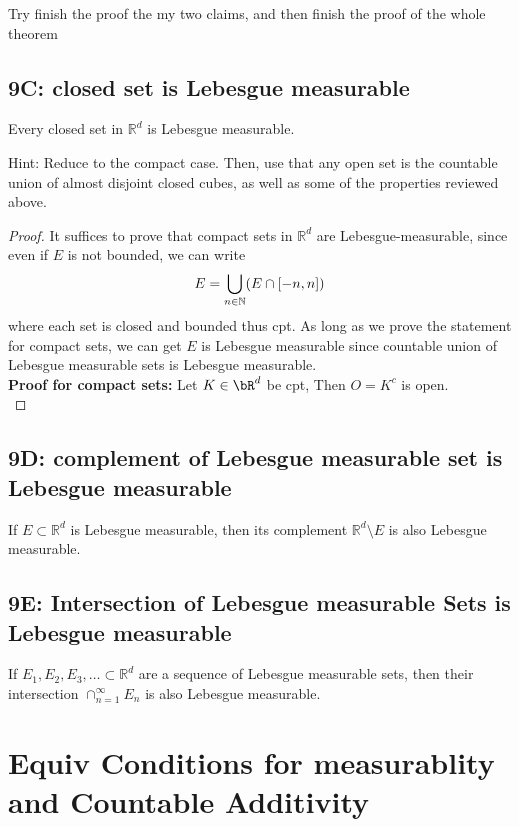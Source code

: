 \documentclass[lang=cn,11pt]{template}
\begin{document}
Try finish the proof the my two claims, and then finish the proof of the whole theorem
\section*{9C: closed set is Lebesgue measurable}
\begin{theorem}
Every closed set in \( \mathbb{R}^d \) is Lebesgue measurable.
\end{theorem}
Hint: Reduce to the compact case. Then, use that any open set is the countable union of almost disjoint closed cubes, as well as some of the properties reviewed above.
\begin{proof}
It suffices to prove that compact sets in $\mathbb{R}^d$ are Lebesgue-measurable, since even if $E$ is not bounded, we can write    $$E =  \displaystyle\bigcup_{n \in \mathbb{N}} (E \cap [-n, n]) $$
where each set is closed and bounded thus cpt. As long as we prove the statement for compact sets, we can get $E$ is Lebesgue measurable since countable union of Lebesgue measurable sets is Lebesgue measurable.\\
\textbf{Proof for compact sets:} Let $K \in \bR ^d $ be cpt, Then $O = K^c$ is open.\\

\end{proof}


\section*{9D: complement of Lebesgue measurable set is Lebesgue measurable} 
\begin{theorem}
If \( E \subset \mathbb{R}^d \) is Lebesgue measurable, then its complement \( \mathbb{R}^d \setminus E \) is also Lebesgue measurable.
\end{theorem}


\section*{9E: Intersection of Lebesgue measurable Sets is Lebesgue measurable}
\begin{theorem}
If \( E_1, E_2, E_3, \ldots \subset \mathbb{R}^d \) are a sequence of Lebesgue measurable sets, then their intersection \( \cap_{n=1}^{\infty} E_n \) is also Lebesgue measurable.
\end{theorem}




\chapter{Equiv Conditions for measurablity and Countable Additivity}
\end{document}

